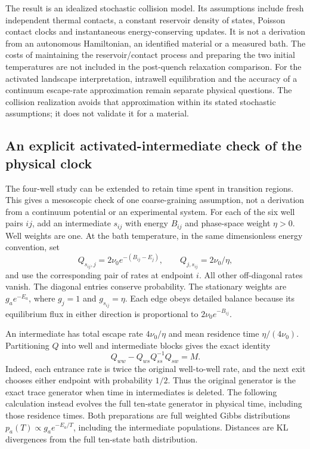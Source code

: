 \documentclass[11pt]{article}
\begin{document}
The result is an idealized stochastic collision model. Its assumptions
include fresh independent thermal contacts, a constant reservoir density
of states, Poisson contact clocks and instantaneous energy-conserving
updates. It is not a derivation from an autonomous Hamiltonian, an
identified material or a measured bath. The costs of maintaining the
reservoir/contact process and preparing the two initial temperatures are
not included in the post-quench relaxation comparison. For the activated
landscape interpretation, intrawell equilibration and the accuracy of a
continuum escape-rate approximation remain separate physical questions.
The collision realization avoids that approximation within its stated
stochastic assumptions; it does not validate it for a material.

\subsection{An explicit activated-intermediate check of the physical clock}
\label{sec:activatedintermediates}
The four-well study can be extended to retain time spent in transition
regions. This gives a mesoscopic check of one coarse-graining assumption,
not a derivation from a continuum potential or an experimental system.
For each of the six well pairs $ij$, add an intermediate $s_{ij}$ with
energy $B_{ij}$ and phase-space weight $\eta>0$. Well weights are one.
At the bath temperature, in the same dimensionless energy convention,
set
\[
 Q_{s_{ij},j}=2\nu_0 e^{-(B_{ij}-E_j)},\qquad
 Q_{j,s_{ij}}=2\nu_0/\eta,
\]
and use the corresponding pair of rates at endpoint $i$. All other
off-diagonal rates vanish. The diagonal entries conserve probability.
The stationary weights are $g_a e^{-E_a}$, where $g_j=1$ and
$g_{s_{ij}}=\eta$. Each edge obeys detailed balance because its equilibrium
flux in either direction is proportional to $2\nu_0 e^{-B_{ij}}$.

An intermediate has total escape rate $4\nu_0/\eta$ and mean residence
time $\eta/(4\nu_0)$. Partitioning $Q$ into well and intermediate blocks
gives the exact identity
\[
 Q_{ww}-Q_{ws}Q_{ss}^{-1}Q_{sw}=M.
\]
Indeed, each entrance rate is twice the original well-to-well rate,
and the next exit chooses either endpoint with probability $1/2$.
Thus the original generator is the exact trace generator when time in
intermediates is deleted. The following calculation instead evolves the
full ten-state generator in physical time, including those residence
times. Both preparations are full weighted Gibbs distributions
$p_a(T)\propto g_a e^{-E_a/T}$, including the intermediate populations.
Distances are KL divergences from the full ten-state bath distribution.
\end{document}
